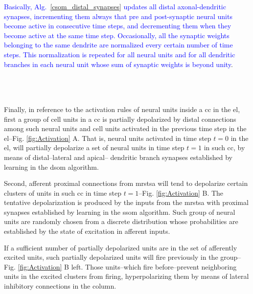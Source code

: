 \documentclass[10pt,letterpaper]{article}
\begin{document}
\textcolor{blue}{Basically, Alg.~\ref{csom_distal_synapses} updates all distal axonal-dendritic synapses, incrementing  them always that pre and post-synaptic neural units become active in consecutive time steps, and decrementing them when they become active at the same time step. Occasionally, all the synaptic weights belonging to the same dendrite are normalized every certain number of time steps. This normalization is repeated for all neural units and for all dendritic branches in each neural unit whose sum of synaptic weights is beyond unity}.







~\\
~\\
~\\

Finally, in reference to the activation rules of neural units inside a \gls{cc} in the \gls{el},
first a group of cell units in a \gls{cc} is partially depolarized 
by distal connections among such neural units and cell units activated in the
previous time step in the \gls{el}--Fig. \ref{fig:Activation} A.
That is, neural units activated in time step $t=0$ in the \gls{el}, will partially depolarize
a set of neural units in time step $t=1$ in such \gls{cc}, by means of distal--lateral and apical--
dendritic branch synapses established by learning in the \gls{dsom} algorithm.

Second, afferent proximal connections from \gls{mrstsa} will tend to depolarize
certain clusters of units in such \gls{cc} in time step $t=1$--Fig. \ref{fig:Activation} B.
The tentative depolarization is produced by the inputs from the \gls{mrstsa} with
proximal synapses established by learning in the \gls{ssom} algorithm. 
Such group of neural units are randomly chosen from a discrete distribution
whose probabilities are established by the state of excitation in afferent inputs.

If a sufficient number of partially depolarized units are in the set of
afferently excited units, such partially depolarized units
will fire previously in the group--Fig. \ref{fig:Activation} B left.
Those units--which fire before--prevent neighboring units in the excited clusters from firing,
hyperpolarizing them by means of lateral inhibitory connections in the column.
\end{document}
